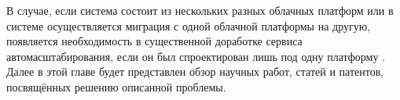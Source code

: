 В случае, если система состоит из нескольких разных облачных платформ или в системе осуществляется миграция с одной облачной платформы на другую, появляется необходимость в существенной доработке сервиса автомасштабирования, если он был спроектирован лишь под одну платформу \cite{fake-31}.
Далее в этой главе будет представлен обзор научных работ, статей и патентов, посвящённых решению описанной проблемы.

